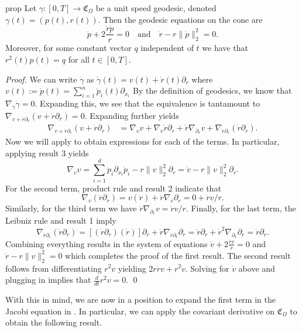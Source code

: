 \documentclass{article}
\begin{document}
\begin{restatable}{prop}{} \label{cone geodesic equations via covariant deriv}
    Let $\gamma: [0, T] \rightarrow \mathfrak{C}_\Omega$ be a unit speed geodesic, denoted $\gamma(t) = \left(p(t), r(t)\right)$.
    Then the geodesic equations on the cone are 
    \[ \ddot p + 2\frac{\dot r \dot p}{r} = 0 \quad \text{and}\quad \ddot r  - r\|\dot p\|_2^2 = 0. \]
    Moreover, for some constant vector $q$ independent of $t$ we have that $r^2(t)p(t) = q$ for all $t \in [0, T]$.
\end{restatable}
\noindent \textit{Proof.} We can write $\dot \gamma$ as $\dot\gamma(t) =  v(t) + \dot r(t) \partial_r$ where $v(t) := \dot p(t) = \sum_{i = 1}^n\dot p_i(t) \partial_{x_i}$ By the definition of geodesics, we know that $\nabla_{\dot \gamma}\dot \gamma = 0$. Expanding this, we see that the equivalence is tantamount to $\nabla_{v + \dot r\partial_r}(v + \dot r \partial_r) = 0.$ Expanding further yields
\begin{align*}
    \nabla_{v + \dot r\partial_r}(v + \dot r \partial_r) &= \nabla_vv + \nabla_v \dot r \partial_r + \dot r \nabla_{\partial_r}v +  \nabla_{\dot r\partial_r}(\dot r \partial_r).
\end{align*}
Now we will apply  to obtain expressions for each of the terms. In particular, applying result 3 yields
\[\nabla_{v}v = \sum_{i = 1}^d\dot p_i \partial_{x_i}\dot p_i - r\|v\|_2^2 \partial_r = \dot v - r\|v\|_2^2\partial_r.\]
For the second term, product rule and result 2 indicate that 
\[\nabla_v (\dot r\partial_r) = v(\dot r) + \dot r \nabla_v\partial_r = 0 + \dot rv/r.\]
Similarly, for the third term we have $\dot r \nabla_{\partial_{r}}v = \dot rv/r$. Finally, for the last term, the Leibniz rule and result 1 imply 
\[\nabla_{\dot r\partial_r}(\dot r\partial_r) = [(\dot r\partial_r)(\dot r )]\partial_r +\dot r \nabla_{\dot r\partial _r}\partial_r = \ddot r \partial_r + \dot r^2\nabla _{\partial_r}\partial_r = \ddot r\partial_r.\]
Combining everything results in the system of equations $\dot v + 2\frac{\dot rv}{r} = 0$ and $\ddot r  - r\|v\|_2^2 = 0$ which completes the proof of the first result. The second result follows from differentiating $r^2v$ yielding $2r\dot rv + r^2\dot v.$ Solving for $\dot v$ above and plugging in implies that $\frac{d}{dt}r^2v = 0$. \qed{}

With this in mind, we are now in a position to expand the first term in the Jacobi equation in . In particular, we can apply the covariant derivative on $\mathfrak{C}_\Omega$ to obtain the following result.
\end{document}
